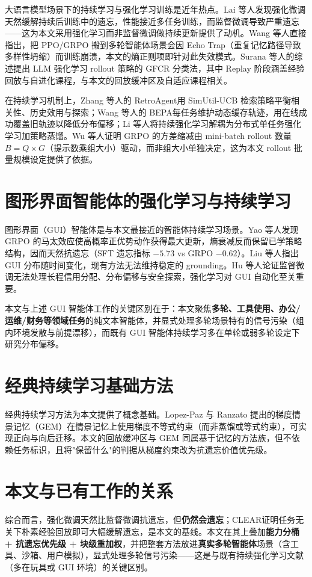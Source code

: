 大语言模型场景下的持续学习与强化学习训练是近年热点。Lai 等人发现强化微调天然缓解持续后训练中的遗忘，性能接近多任务训练，而监督微调导致严重遗忘——这为本文采用强化学习而非监督微调做持续更新提供了动机。Wang 等人直接指出，把 PPO/GRPO 搬到多轮智能体场景会因 Echo Trap（重复记忆路径导致多样性坍缩）而训练崩溃，本文的熵正则项即针对此失效模式。Surana 等人的综述提出 LLM 强化学习 rollout 策略的 GFCR 分类法，其中 Replay 阶段涵盖经验回放与自进化课程，与本文的回放缓冲区及自适应课程相关。

在持续学习机制上，Zhang 等人的 RetroAgent用 SimUtil-UCB 检索策略平衡相关性、历史效用与探索；Wang 等人的 BEPA每任务维护动态缓存轨迹，用在线成功覆盖旧轨迹以降低分布偏移；Li 等人将持续强化学习解耦为分布式单任务强化学习加策略蒸馏。Wu 等人证明 GRPO 的方差缩减由 mini-batch rollout 数量 $B=Q\times G$（提示数乘组大小）驱动，而非组大小单独决定，这为本文 rollout 批量规模设定提供了依据。

\section{图形界面智能体的强化学习与持续学习}
\label{sec:rel-gui}

图形界面（GUI）智能体是与本文最接近的智能体持续学习场景。Yao 等人发现 GRPO 的马太效应使高概率正优势动作获得最大更新，熵衰减反而保留已学策略结构，因而天然抗遗忘（SFT 遗忘指标 $-5.73$ vs GRPO $-0.62$）。Liu 等人指出 GUI 分布随时间变化，现有方法无法维持稳定的 grounding。Hu 等人论证监督微调无法处理长程信用分配、分布偏移与安全探索，强化学习对 GUI 自动化至关重要。

本文与上述 GUI 智能体工作的关键区别在于：本文聚焦\textbf{多轮、工具使用、办公/运维/财务等领域任务}的纯文本智能体，并显式处理多轮场景特有的信号污染（组内环境发散与前提漂移），而既有 GUI 智能体持续学习多在单轮或弱多轮设定下研究分布偏移。

\section{经典持续学习基础方法}
\label{sec:rel-classic}

经典持续学习方法为本文提供了概念基础。Lopez-Paz 与 Ranzato 提出的梯度情景记忆（GEM）在情景记忆上使用梯度不等式约束（而非蒸馏或等式约束），可实现正向与向后迁移。本文的回放缓冲区与 GEM 同属基于记忆的方法族，但不依赖任务标识，且将"保留什么"的判据从梯度约束改为抗遗忘价值优先级。

\section{本文与已有工作的关系}
\label{sec:rel-position}

综合而言，强化微调天然比监督微调抗遗忘，但\textbf{仍然会遗忘}；CLEAR证明任务无关下朴素经验回放即可大幅缓解遗忘，是本文的基线。本文在其上叠加\textbf{能力分桶 + 抗遗忘优先级 + 块级重加权}，并把整套方法放进\textbf{真实多轮智能体}场景（含工具、沙箱、用户模拟），显式处理多轮信号污染——这是与既有持续强化学习文献（多在玩具或 GUI 环境）的关键区别。
